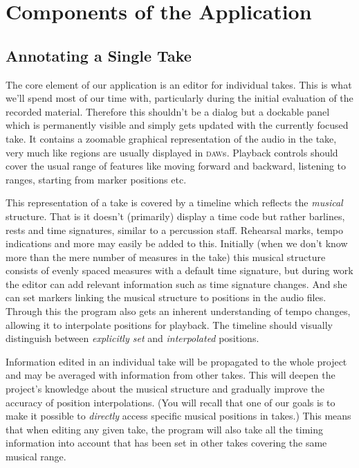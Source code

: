 \documentclass[11pt,a4paper]{article}
\begin{document}
\section{Components of the Application}

\subsection{Annotating a Single Take}
The core element of our application is an editor for individual takes.
This is what we'll spend most of our time with, particularly during the initial
evaluation of the recorded material.
Therefore this shouldn't be a dialog but a dockable panel which is permanently
visible and simply gets updated with the currently focused take.
It contains a zoomable graphical representation of the audio in the take, very
much like regions are usually displayed in \textsc{daw}s.
Playback controls should cover the usual range of features like moving forward
and backward, listening to ranges, starting from marker positions etc.

This representation of a take is covered by a timeline which reflects the
\emph{musical} structure.
That is it doesn't (primarily) display a time code but rather barlines, rests
and time signatures, similar to a percussion staff.
Rehearsal marks, tempo indications and more may easily be added to this.
Initially (when we don't know more than the mere number of measures in the take)
this musical structure consists of evenly spaced measures with a default time
signature, but during work the editor can add relevant information such as time
signature changes.
And she can set markers linking the musical structure to positions in the audio
files.
Through this the program also gets an inherent understanding of tempo changes,
allowing it to interpolate positions for playback.
The timeline should visually distinguish between \emph{explicitly set} and
\emph{interpolated} positions.

Information edited in an individual take will be propagated to the whole project
and may be averaged with information from other takes.
This will deepen the project's knowledge about the musical structure and
gradually improve the accuracy of position interpolations.
(You will recall that one of our goals is to make it possible to \emph{directly}
access specific musical positions in takes.)
This means that when editing any given take, the program will also take all the
timing information into account that has been set in other takes covering the
same musical range.
\end{document}
